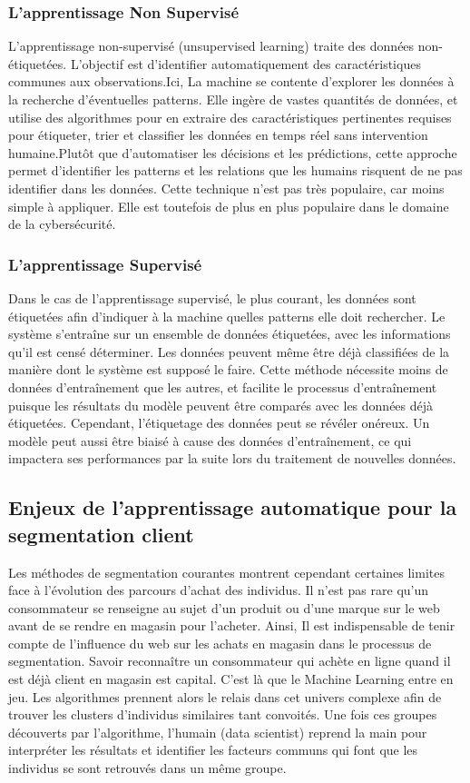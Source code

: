 \documentclass{article}
\begin{document}
\subsubsection{L'apprentissage Non Supervisé}
L’apprentissage non-supervisé (unsupervised learning) traite des données non-étiquetées.
L’objectif est d’identifier automatiquement des caractéristiques communes aux observations.Ici, La machine se contente d’explorer les données à la recherche d’éventuelles patterns. Elle ingère de vastes quantités de données, et utilise des algorithmes pour en extraire des caractéristiques pertinentes requises pour étiqueter, trier et classifier les données en temps réel sans intervention humaine.Plutôt que d’automatiser les décisions et les prédictions, cette approche permet d’identifier les patterns et les relations que les humains risquent de ne pas identifier dans les données. Cette technique n’est pas très populaire, car moins simple à appliquer. Elle est toutefois de plus en plus populaire dans le domaine de la cybersécurité.
\subsubsection{L'apprentissage Supervisé}
Dans le cas de l’apprentissage supervisé, le plus courant, les données sont étiquetées afin d’indiquer à la machine quelles patterns elle doit rechercher. Le système s’entraîne sur un ensemble de données étiquetées, avec les informations qu’il est censé déterminer. Les données peuvent même être déjà classifiées de la manière dont le système est supposé le faire. Cette méthode nécessite moins de données d’entraînement que les autres, et facilite le processus d’entraînement puisque les résultats du modèle peuvent être comparés avec les données déjà étiquetées. Cependant, l’étiquetage des données peut se révéler onéreux. Un modèle peut aussi être biaisé à cause des données d’entraînement, ce qui impactera ses performances par la suite lors du traitement de nouvelles données.
\subsection{Enjeux de l'apprentissage automatique pour la segmentation client}
Les méthodes de segmentation courantes montrent cependant certaines limites face à l’évolution des parcours d’achat des individus. Il n’est pas rare qu’un consommateur se renseigne au sujet d’un produit ou d’une marque sur le web avant de se rendre en magasin pour l’acheter. 
Ainsi, Il est indispensable de tenir compte de l’influence du web  sur les achats en magasin dans le processus de segmentation. Savoir reconnaître un consommateur qui achète en ligne quand il est déjà client en magasin est capital. C’est là que le Machine Learning entre en jeu.  Les algorithmes prennent alors le relais dans cet univers complexe afin de trouver les  clusters  d’individus similaires tant convoités. Une fois ces groupes découverts par l’algorithme, l’humain (data scientist) reprend la main pour interpréter les résultats et identifier les facteurs communs qui font que les individus se sont retrouvés dans un même groupe.
\end{document}
